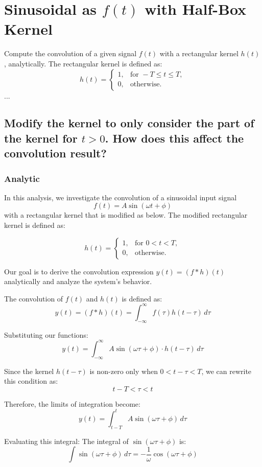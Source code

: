 \section{Sinusoidal as $f(t)$ with Half-Box Kernel}

Compute the convolution of a given signal \( f(t) \) with a rectangular kernel \( h(t) \), analytically. The rectangular kernel is defined as:
\[
h(t) = 
\begin{cases}
1, & \text{for } -T \leq t \leq T, \\
0, & \text{otherwise}.
\end{cases}
\]
...

\subsection{Modify the kernel to only consider the part of the kernel for \( t > 0 \). How does this affect the convolution result?}

\subsubsection{Analytic}
In this analysis, we investigate the convolution of a sinusoidal input signal
\[
f(t) = A \sin(\omega t + \phi)
\]
with a rectangular kernel that is modified as below. The modified rectangular kernel is defined as:

\[
h(t) =
\begin{cases}
1, & \text{for } 0 < t < T, \\
0, & \text{otherwise}.
\end{cases}
\]

Our goal is to derive the convolution expression \( y(t) = (f \ast h)(t) \) analytically and analyze the system’s behavior.

The convolution of \( f(t) \) and \( h(t) \) is defined as:
\[
y(t) = (f \ast h)(t) = \int_{-\infty}^{\infty} f(\tau) h(t - \tau) \, d\tau
\]

Substituting our functions:
\[
y(t) = \int_{-\infty}^{\infty} A \sin(\omega \tau + \phi) \cdot h(t - \tau) \, d\tau
\]

Since the kernel \( h(t - \tau) \) is non-zero only when \( 0  < t - \tau <  T \), we can rewrite this condition as:
\[
t - T < \tau < t
\]

Therefore, the limits of integration become:
\[
y(t) = \int_{t - T}^{t} A \sin(\omega \tau + \phi) \, d\tau
\]

Evaluating this integral:
The integral of \( \sin(\omega \tau + \phi) \) is:
\[
\int \sin(\omega \tau + \phi) \, d\tau = -\frac{1}{\omega} \cos(\omega \tau + \phi)
\]

